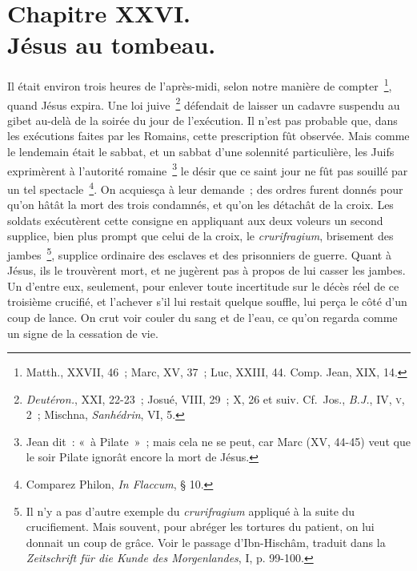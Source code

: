 \documentclass[french,twoside]{book} %
\newcommand\chapteropen{} %
\newcommand\chaptercont{} %
\begin{document}
\chapteropen
\chapter[{Chapitre XXVI. Jésus au tombeau.}]{Chapitre XXVI.\\
Jésus au tombeau.}\renewcommand{\leftmark}{Chapitre XXVI.\\
Jésus au tombeau.}


\chaptercont
\noindent Il était environ trois heures de l’après-midi, selon notre manière de compter \footnote{Matth., XXVII, 46 ; Marc, XV, 37 ; Luc, XXIII, 44. Comp. Jean, XIX, 14.}, quand Jésus expira. Une loi juive \footnote{{\itshape Deutéron.}, XXI, 22-23 ; Josué, VIII, 29 ; X, 26 et suiv. Cf. Jos., {\itshape B.J.}, IV, \textsc{v}, 2 ; Mischna, {\itshape Sanhédrin}, VI, 5.} défendait de laisser un cadavre suspendu au gibet au-delà de la soirée du jour de l’exécution. Il n’est pas probable que, dans les exécutions faites par les Romains, cette prescription fût observée. Mais comme le lendemain était le sabbat, et un sabbat d’une solennité particulière, les Juifs exprimèrent à l’autorité romaine \footnote{Jean dit : « à Pilate » ; mais cela ne se peut, car Marc (XV, 44-45) veut que le soir Pilate ignorât encore la mort de Jésus.} le désir que ce saint jour ne fût pas souillé par un tel spectacle \footnote{ Comparez Philon, {\itshape In Flaccum}, § 10.}. On acquiesça à leur demande ; des ordres furent donnés pour qu’on hâtât la mort des trois condamnés, et qu’on les détachât de la croix. Les soldats exécutèrent cette consigne en appliquant aux deux voleurs un second supplice, bien plus prompt que celui de la croix, le {\itshape crurifragium}, brisement des jambes \footnote{ Il n’y a pas d’autre exemple du {\itshape crurifragium} appliqué à la suite du crucifiement. Mais souvent, pour abréger les tortures du patient, on lui donnait un coup de grâce. Voir le passage d’Ibn-Hischâm, traduit dans la {\itshape Zeitschrift für die Kunde des Morgenlandes}, I, p. 99-100.}, supplice ordinaire des esclaves et des prisonniers de guerre. Quant à Jésus, ils le trouvèrent mort, et ne jugèrent pas à propos de lui casser les jambes. Un d’entre eux, seulement, pour enlever toute incertitude sur le décès réel de ce troisième crucifié, et l’achever s’il lui restait quelque souffle, lui perça le côté d’un coup de lance. On crut voir couler du sang et de l’eau, ce qu’on regarda comme un signe de la cessation de vie.\par
\end{document}
